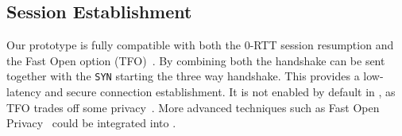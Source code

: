 
\subsection{\tcpls Session Establishment}

Our prototype is fully compatible with both the  0-RTT session resumption
and the \tcp Fast Open option (TFO)~\cite{radhakrishnan2011tcp}. By combining both
the \tcpls handshake can be sent together with the \tcp \texttt{SYN} starting 
the three way handshake. This provides a low-latency and secure connection establishment.
It is not enabled by default in \tcpls, as TFO trades off some privacy~\cite{sy2020enhanced}.
More advanced techniques such as \tcp Fast Open Privacy~\cite{sy2020enhanced} could be
integrated into \tcpls.





